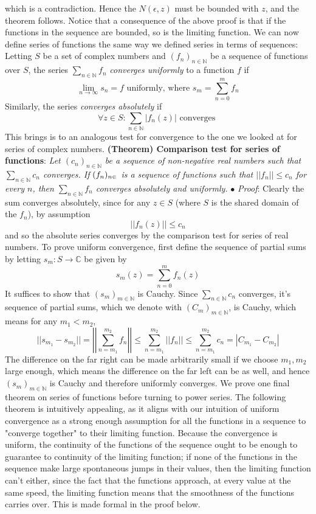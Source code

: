 \documentclass{article}
\newcommand*{\tb}{\textbf}
\newcommand*{\ti}{\textit}
\newcommand*{\n}{\newline}
\newcommand*{\nn}{\newline \newline}
\newcommand*{\Pf}{\indent \ensuremath{\bullet} \textit{Proof}: }
\newcommand*{\N}{\mathbb{N}}
\newcommand*{\C}{\mathbb{C}}
\begin{document}
which is a contradiction. Hence the $ N(\epsilon, z) $ must be bounded with $ z $, and the theorem follows. \qedsymbol
\nn
Notice that a consequence of the above proof is that if the functions in the sequence are bounded, so is the limiting function. We can now define series of functions the same way we defined series in terms of sequences: Letting $ S $ be a set of complex numbers and $ ( f_n )_{n \in \N} $ be a sequence of functions over $ S $, the series $ \sum_{n \in \N} f_n $ \ti{converges uniformly} to a function $ f $ if
    $$ \lim_{n \to \infty} s_n = f \text{ uniformly, where } s_m = \sum_{n = 0}^m f_n $$
Similarly, the series \ti{converges absolutely} if
    $$ \forall z \in S: \sum_{n \in \N} | f_n(z) | \text{ converges } $$
This brings is to an analogous test for convergence to the one we looked at for series of complex numbers.
\nn
\tb{(Theorem) Comparison test for series of functions}: \ti{Let $ ( c_n )_{n \in \N} $ be a sequence of non-negative real numbers such that $ \sum_{n \in \N} c_n $ converges. If $ ( f_n )_{n \in \n} $ is a sequence of functions such that $ || f_n || \leq c_n $ for every $ n $, then $ \sum_{n \in \N} f_n $ converges absolutely and uniformly.}
\n
\Pf Clearly the sum converges absolutely, since for any $ z \in S $ (where $ S $ is the shared domain of the $ f_n $), by assumption $$ || f_n(z) || \leq c_n $$ and so the absolute series converges by the comparison test for series of real numbers.
\n
To prove uniform convergence, first define the sequence of partial sums by letting $ s_m: S \rightarrow \C $ be given by
    $$ s_m(z) = \sum_{n = 0}^m f_n(z) $$
It suffices to show that $ ( s_m )_{m \in \N} $ is Cauchy. Since $ \sum_{n \in \N} c_n $ converges, it's sequence of partial sums, which we denote with $ ( C_m )_{m \in \N} $, is Cauchy, which means for any $ m_1 < m_2 $,
    $$ || s_{m_1} - s_{m_2} || = \left \vert \left \vert \sum_{n = m_1}^{m_2} f_n \right \vert \right \vert \leq \sum_{n = m_1}^{m_2} || f_n || \leq \sum_{n = m_1}^{m_2} c_n = | C_{m_1} - C_{m_2} | $$
The difference on the far right can be made arbitrarily small if we choose $ m_1, m_2 $ large enough, which means the difference on the far left can be as well, and hence $ ( s_m )_{m \in \N} $ is Cauchy and therefore uniformly converges. \qedsymbol
\nn
We prove one final theorem on series of functions before turning to power series. The following theorem is intuitively appealing, as it aligns with our intuition of uniform convergence as a strong enough assumption for all the functions in a sequence to "converge together" to their limiting function. Because the convergence is uniform, the continuity of the functions of the sequence ought to be enough to guarantee to continuity of the limiting function; if none of the functions in the sequence make large spontaneous jumps in their values, then the limiting function can't either, since the fact that the functions approach, at every value at the same speed, the limiting function means that the smoothness of the functions carries over. This is made formal in the proof below.
\end{document}
